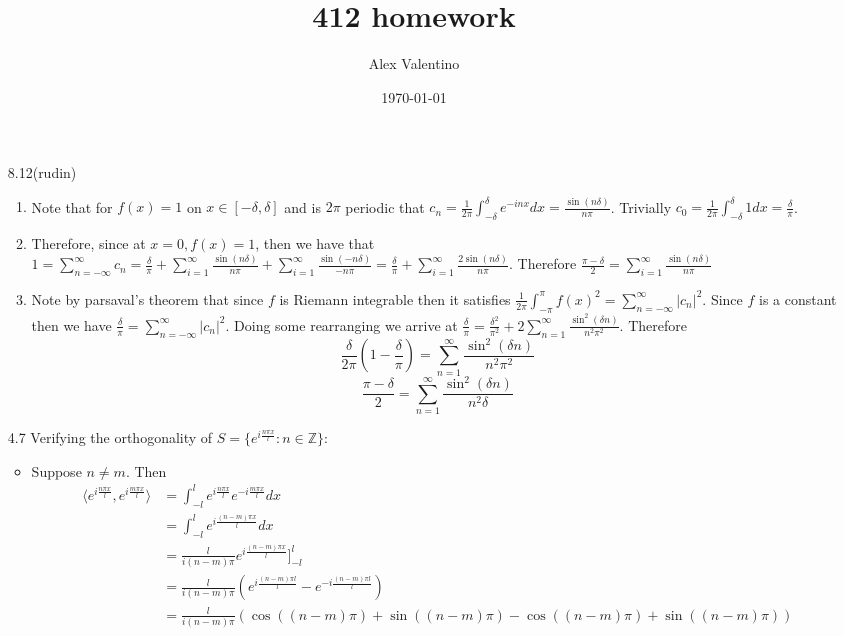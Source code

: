 \documentclass[12pt, letterpaper]{article}
\date{\today}
\author{Alex Valentino}
\title{412 homework}
\newcommand{\Z}{\mathbb{Z}}
\begin{document}
\begin{enumerate}
	\item[8.12(rudin)]
	\begin{enumerate}
		\item Note that for $f(x) = 1$ on $x \in [-\delta,\delta]$ and is $2\pi$ periodic
		that $c_n = \frac{1}{2 \pi}\int_{-\delta}^\delta e^{-inx}dx = \frac{\sin(n\delta)}{n\pi} $.  Trivially $c_0 = \frac{1}{2 \pi} \int_{-\delta}^\delta 1 dx = \frac{\delta}{\pi}$.
		
		\item Therefore, since at $x=0, f(x) = 1$, then we have that $1 = \sum_{n = - \infty}^\infty
		c_n = \frac{\delta}{\pi} + \sum_{i=1}^\infty \frac{\sin(n\delta)}{n\pi} +
		\sum_{i=1}^\infty  \frac{\sin(-n\delta)}{-n\pi} = \frac{\delta}{\pi} + 
		\sum_{i=1}^\infty \frac{2\sin(n\delta)}{n\pi}$.  Therefore 
		$\frac{\pi - \delta}{2} = \sum_{i=1}^\infty \frac{\sin(n\delta)}{n\pi}$
		\item Note by parsaval's theorem that since $f$ is Riemann integrable then it 
		satisfies $\frac{1}{2 \pi}\int_{-\pi}^\pi f(x)^2 = \sum_{n=-\infty}^\infty |c_n|^2$.
		Since $f$ is a constant then we have $\frac{\delta}{\pi} = 
		\sum_{n=-\infty}^\infty |c_n|^2$.  Doing some rearranging we arrive at 
		$\frac{\delta}{\pi} = \frac{\delta^2}{\pi^2} + 
		2\sum_{n=1}^\infty \frac{\sin^2(\delta n)}{n^2 \pi^2}$.  Therefore
		$$
		\frac{\delta}{2\pi}\left(1 - \frac{\delta}{\pi} \right) = \sum_{n=1}^\infty \frac{\sin^2(\delta n)}{n^2 \pi^2}
		$$
		$$
		\frac{\pi - \delta}{2} = \sum_{n=1}^\infty \frac{\sin^2(\delta n)}{n^2 \delta}
		$$
	\end{enumerate}
	\item[4.7] Verifying the orthogonality of $S = \{e^{i\frac{n\pi x}{l}}: n \in \Z\}$:
	\begin{itemize}
		\item Suppose $n \neq m$.  Then 
		\begin{align*}
			\langle e^{i\frac{n\pi x}{l}},e^{i\frac{m\pi x}{l}} \rangle &= 
			\int_{-l}^l e^{i\frac{n\pi x}{l}}e^{-i\frac{m\pi x}{l}} dx\\
			&= \int_{-l}^l e^{i\frac{(n-m)\pi x}{l}} dx\\
			&= \frac{l}{i(n-m)\pi} e^{i\frac{(n-m)\pi x}{l}}]_{-l}^l \\
			&= \frac{l}{i(n-m)\pi} \left(e^{i\frac{(n-m)\pi l}{l}} - e^{-i\frac{(n-m)\pi l}{l}} \right)\\
			&= \frac{l}{i(n-m)\pi} (\cos((n-m)\pi) + \sin((n-m)\pi) - \cos((n-m)\pi) +\sin((n-m)\pi) )\\

\end{align*}
\end{itemize}
\end{enumerate}
\end{document}
